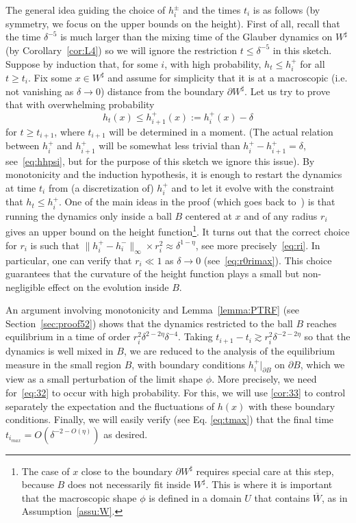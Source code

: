 \documentclass[10pt]{amsart}
\theoremstyle{definition}\newtheorem{defi}[theo]{Definition}\newtheorem{rema}[theo]{Remark}\newtheorem{exam}[theo]{Example}\newtheorem{exem}[theo]{Example}\newtheorem{nota}[theo]{Notation}
\renewcommand{\d}{{\sharp }}
\begin{document}
The general idea guiding the choice of $h^\pm_i$ and the times $t_i$ is as follows (by symmetry, we focus on the upper bounds on the height). First of all, recall that the time $ \delta^{-5}$ is much larger than the mixing time of the Glauber dynamics on $W^\d$ (by
Corollary~\ref{cor:L4}) so we will ignore the restriction $t\le \delta^{-5}$ in this sketch. Suppose by induction that, for some $i$, with high probability, $h_t \leq h_{i}^+$ for all $t \geq t_i$. Fix some $x \in W^\d$ and assume for simplicity that it is at a macroscopic (i.e. not vanishing as $\delta\to0$) distance from the boundary $\partial W^\d$. Let us try to prove that with overwhelming probability
\begin{equation}\label{eq:32}
h_t(x) \leq h^+_{{i+1}}(x):=h^+_{i}(x)-\delta
\end{equation}
for $t\ge t_{i+1}$, where $t_{i+1}$ will be determined in a moment. (The actual relation between $h^+_i$ and $h^+_{i+1}$ will be somewhat less trivial than $h^+_i-h^+_{i+1}=\delta$, see~\eqref{eq:hhpsi}, but for the purpose of this sketch we ignore this issue). By monotonicity and the induction hypothesis, it is enough to restart the dynamics at time $t_i$ from (a discretization of) $h^+_{i}$ and to let it evolve with the constraint that $h_t\le h^+_{i}$. One of the main ideas in the proof (which goes back to~\cite{CMT}) is that running the dynamics only inside a ball $B$ centered at $x$ and of any radius $r_i$ gives an upper bound on the height function\footnote{The case of $x$ close to the boundary $\partial W^\d$ requires special care at this step, because $B$ does not necessarily fit inside $W^\d$. This is where it is important that the macroscopic shape $\phi$ is defined in a domain $U$ that contains $\overline W$, as in Assumption~\ref{assu:W}.}. It turns out that the correct choice for $r_i$ is such that $\|h^+_i-h^-_i\|_\infty \times r_i^2 \approx \delta^{1- \eta}$, see more precisely~\eqref{eq:ri}. In particular, one can verify that $r_i\ll 1$ as $\delta\to0$ (see~\eqref{eq:r0rimax}). This choice guarantees that the curvature of the height function plays a small but non-negligible effect on the evolution inside $B$.

An argument involving monotonicity and Lemma~\ref{lemma:PTRF} (see Section~\ref{sec:proof52}) shows that the dynamics restricted to the ball $B$ reaches equilibrium in a time of order $ r_i^2 \delta^{2-2\eta} \delta^{-4} $. Taking $t_{i+1} - t_i\gtrsim r_i^2 \delta^{-2-2\eta}$ so that the dynamics is well mixed in $B$, we are reduced to the analysis of the equilibrium measure in the small region $B$, with boundary conditions $h^+_{i}|_{\partial B}$ on $\partial B$, which we view as a small perturbation of the limit shape $\phi$. More precisely, we need for~\eqref{eq:32} to occur with high probability. For this, we will use
\cref{cor:33} to control separately the expectation and the fluctuations of $h(x)$ with these boundary conditions. Finally, we will easily verify (see Eq. \eqref{eq:tmax}) that the final time $t_{i_{max}}=O(\delta^{-2-O(\eta)})$ as desired.
\end{document}
